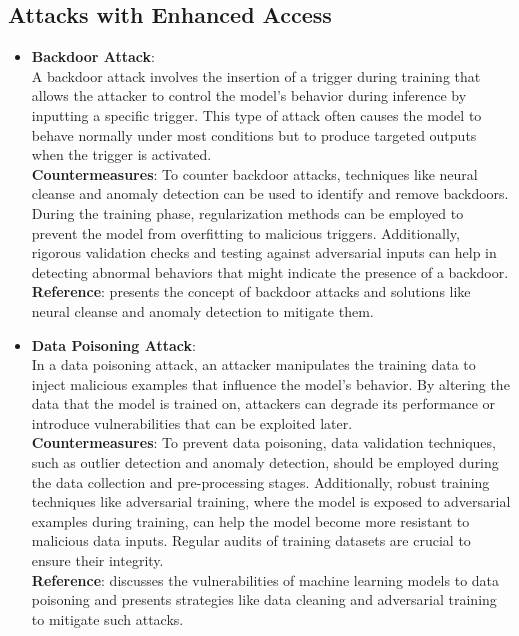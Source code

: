 \documentclass[12pt]{article}
\begin{document}
    \subsection{Attacks with Enhanced Access}
    \begin{itemize}
        \item \textbf{Backdoor Attack}: \\
        A backdoor attack involves the insertion of a trigger during training that allows the attacker to control the model’s behavior during inference by inputting a specific trigger. This type of attack often causes the model to behave normally under most conditions but to produce targeted outputs when the trigger is activated. \\
        \textbf{Countermeasures}: To counter backdoor attacks, techniques like neural cleanse and anomaly detection can be used to identify and remove backdoors. During the training phase, regularization methods can be employed to prevent the model from overfitting to malicious triggers. Additionally, rigorous validation checks and testing against adversarial inputs can help in detecting abnormal behaviors that might indicate the presence of a backdoor. \\
        \textbf{Reference}: \cite{Gu_2017} presents the concept of backdoor attacks and solutions like neural cleanse and anomaly detection to mitigate them.

        \item \textbf{Data Poisoning Attack}: \\
        In a data poisoning attack, an attacker manipulates the training data to inject malicious examples that influence the model's behavior. By altering the data that the model is trained on, attackers can degrade its performance or introduce vulnerabilities that can be exploited later. \\
        \textbf{Countermeasures}: To prevent data poisoning, data validation techniques, such as outlier detection and anomaly detection, should be employed during the data collection and pre-processing stages. Additionally, robust training techniques like adversarial training, where the model is exposed to adversarial examples during training, can help the model become more resistant to malicious data inputs. Regular audits of training datasets are crucial to ensure their integrity. \\
        \textbf{Reference}: \cite{Biggio_2012} discusses the vulnerabilities of machine learning models to data poisoning and presents strategies like data cleaning and adversarial training to mitigate such attacks.


\end{itemize}
\end{document}
